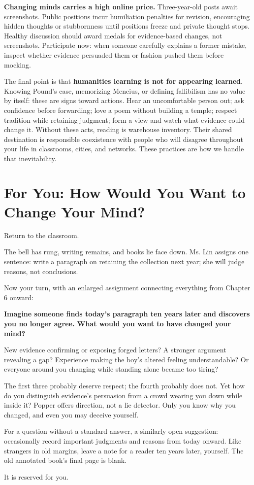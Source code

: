 \textbf{Changing minds carries a high online price.} Three-year-old posts await screenshots. Public positions incur humiliation penalties for revision, encouraging hidden thoughts or stubbornness until positions freeze and private thought stops. Healthy discussion should award medals for evidence-based changes, not screenshots. Participate now: when someone carefully explains a former mistake, inspect whether evidence persuaded them or fashion pushed them before mocking.

The final point is that \textbf{humanities learning is not for appearing learned}. Knowing Pound's case, memorizing Mencius, or defining fallibilism has no value by itself: these are signs toward actions. Hear an uncomfortable person out; ask confidence before forwarding; love a poem without building a temple; respect tradition while retaining judgment; form a view and watch what evidence could change it. Without these acts, reading is warehouse inventory. Their shared destination is responsible coexistence with people who will disagree throughout your life in classrooms, cities, and networks. These practices are how we handle that inevitability.

\section[How Would You Change Your Mind?]{For You: How Would You Want to Change Your Mind?}
Return to the classroom.

The bell has rung, writing remains, and books lie face down. Ms. Lin assigns one sentence: write a paragraph on retaining the collection next year; she will judge reasons, not conclusions.

Now your turn, with an enlarged assignment connecting everything from Chapter 6 onward:

\textbf{Imagine someone finds today's paragraph ten years later and discovers you no longer agree. What would you want to have changed your mind?}

New evidence confirming or exposing forged letters? A stronger argument revealing a gap? Experience making the boy's altered feeling understandable? Or everyone around you changing while standing alone became too tiring?

The first three probably deserve respect; the fourth probably does not. Yet how do you distinguish evidence's persuasion from a crowd wearing you down while inside it? Popper offers direction, not a lie detector. Only you know why you changed, and even you may deceive yourself.

For a question without a standard answer, a similarly open suggestion: occasionally record important judgments and reasons from today onward. Like strangers in old margins, leave a note for a reader ten years later, yourself. The old annotated book's final page is blank.

It is reserved for you.

\backmatter
